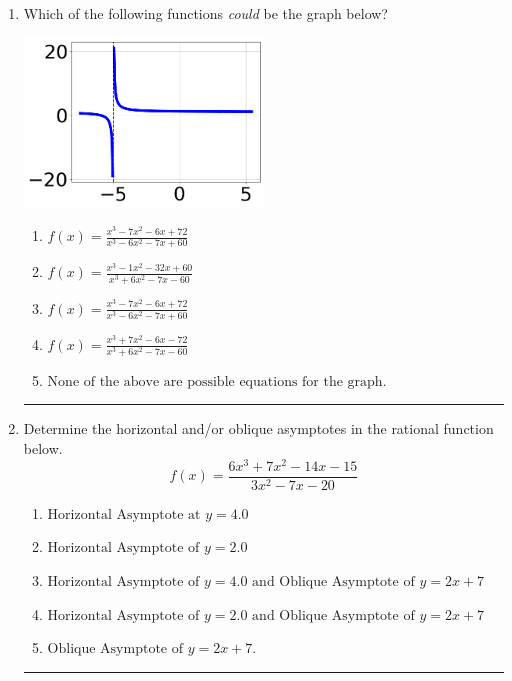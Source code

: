 \documentclass[14pt]{extbook}
\newcommand{\litem}[1]{\item#1\hspace*{-1cm}\rule{\textwidth}{0.4pt}}
\begin{document}
\begin{enumerate}
{\begin{enumerate}[label=\Alph*.]
\end{enumerate} }
\litem{
Which of the following functions \textit{could} be the graph below?
\begin{center}
    \includegraphics[width=0.5\textwidth]{../Figures/identifyGraphOfRationalFunctionCopyB.png}
\end{center}
\begin{enumerate}[label=\Alph*.]
\item \( f(x)=\frac{x^{3} -7 x^{2} -6 x + 72}{x^{3} -6 x^{2} -7 x + 60} \)
\item \( f(x)=\frac{x^{3} -1 x^{2} -32 x + 60}{x^{3} +6 x^{2} -7 x -60} \)
\item \( f(x)=\frac{x^{3} -7 x^{2} -6 x + 72}{x^{3} -6 x^{2} -7 x + 60} \)
\item \( f(x)=\frac{x^{3} +7 x^{2} -6 x -72}{x^{3} +6 x^{2} -7 x -60} \)
\item \( \text{None of the above are possible equations for the graph.} \)

\end{enumerate} }
\litem{
Determine the horizontal and/or oblique asymptotes in the rational function below.\[ f(x) = \frac{6x^{3} +7 x^{2} -14 x -15}{3x^{2} -7 x -20} \]\begin{enumerate}[label=\Alph*.]
\item \( \text{Horizontal Asymptote at } y = 4.0 \)
\item \( \text{Horizontal Asymptote of } y = 2.0  \)
\item \( \text{Horizontal Asymptote of } y = 4.0 \text{ and Oblique Asymptote of } y = 2x + 7 \)
\item \( \text{Horizontal Asymptote of } y = 2.0 \text{ and Oblique Asymptote of } y = 2x + 7 \)
\item \( \text{Oblique Asymptote of } y = 2x + 7. \)


\end{enumerate}}
\end{enumerate}
\end{document}
